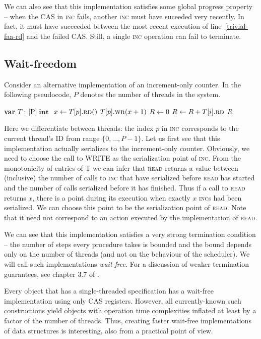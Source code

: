 \documentclass[a4paper,11pt]{article}
\def\int{\ensuremath{\operatorname{\textbf{int}}}}
\newcommand{\fn}[1]{\textsc{#1}}
\newcommand{\var}[2]{\textbf{var }#1 : #2}
\newcommand{\arrayspec}[1]{\text{array}[#1]\text{ of }}
\begin{document}
We can also see that this implementation satisfies some global progress property -- when the CAS in \fn{inc} fails,
another \fn{inc} must have suceeded very recently. In fact, it must have succeeded between the most recent execution
of line~\ref{trivial-faa-rd} and the failed CAS. Still, a single \fn{inc} operation can fail to terminate.

\subsection{Wait-freedom}

Consider an alternative implementation of an increment-only counter. In the following pseudocode, $P$ denotes
the number of threads in the system.

\begin{algorithmic}[1]
	\State\var{$T$}{\arrayspec{P}$\int$} \Comment{T is an array of $P$ CAS objects of type \int}
	\State $x \gets T[p].\fn{rd}()$
	\State $T[p].\fn{wr}(x + 1)$
\EndFunction
{}
	\State $R \gets 0$
	\State $R \gets R + T[i].\fn{rd}$
	\EndFor
	\State\Return $R$
\EndFunction
\end{algorithmic}

Here we differentiate between threads: the index $p$ in \fn{inc} corresponds to the current thread's ID from range
$\{0, \ldots, P-1\}$. Let us first see that this implementation actually serializes to the increment-only counter.
Obviously, we need to choose the call to WRITE as the serialization point of \fn{inc}. From the monotonicity
of entries of T we can infer that \fn{read} returns a value between (inclusive) the number of calls to \fn{inc} that have
serialized before \fn{read} has started and the number of calls serialized before it has finished.
Thus if a call to \fn{read} returns $x$, there is a point during its
execution when exactly $x$ \fn{inc}s had been serialized. We can choose this point to be the serialization point of
\fn{read}. Note that it need not correspond to an action executed by the implementation of \fn{read}.

We can see that this implementation satisfies a very strong termination condition -- the number of steps every
procedure takes is bounded and the bound depends only on the number of threads (and not on the behaviour of
the scheduler). We will call such implementations \emph{wait-free}. For a discussion of weaker
termination guarantees, see chapter 3.7 of \cite{TheArt}.

Every object that has a single-threaded specification has a wait-free implementation\cite{cas-univ} using
only CAS registers.
However, all currently-known such constructions yield objects with operation time complexities inflated at least by a factor
of the number of threads.
Thus, creating faster wait-free implementations of data structures is interesting, also from a practical
point of view.
\end{document}
